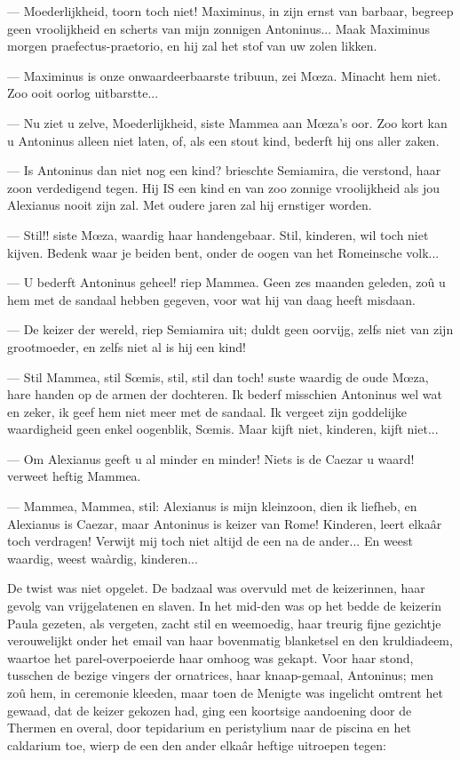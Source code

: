 \documentclass[a4paper, 12pt, oneside, dutch]{article}
\begin{document}
--- Moederlijkheid, toorn toch niet! Maximinus, in zijn ernst van barbaar, begreep geen vroolijkheid en scherts van mijn zonnigen Antoninus... Maak Maximinus morgen praefectus-praetorio, en hij zal het stof van uw zolen likken.

--- Maximinus is onze onwaardeerbaarste tribuun, zei Mœza. Minacht hem niet. Zoo ooit oorlog uitbarstte...

--- Nu ziet u zelve, Moederlijkheid, siste Mammea aan Mœza's oor. Zoo kort kan u Antoninus alleen niet laten, of, als een stout kind, bederft hij ons aller zaken.

--- Is Antoninus dan niet nog een kind? brieschte Semiamira, die verstond, haar zoon verdedigend tegen. Hij IS een kind en van zoo zonnige vroolijkheid als jou Alexianus nooit zijn zal. Met oudere jaren zal hij ernstiger worden.

--- Stil!! siste Mœza, waardig haar handengebaar. Stil, kinderen, wil toch niet kijven. Bedenk waar je beiden bent, onder de oogen van het Romeinsche volk...

--- U bederft Antoninus geheel! riep Mammea. Geen zes maanden geleden, zoû u hem met de sandaal hebben gegeven, voor wat hij van daag heeft misdaan.

--- De keizer der wereld, riep Semiamira uit; duldt geen oorvijg, zelfs niet van zijn grootmoeder, en zelfs niet al is hij een kind!

--- Stil Mammea, stil Sœmis, stil, stil dan toch! suste waardig de oude Mœza, hare handen op de armen der dochteren. Ik bederf misschien Antoninus wel wat en zeker, ik geef hem niet meer met de sandaal. Ik vergeet zijn goddelijke waardigheid geen enkel oogenblik, Sœmis. Maar kijft niet, kinderen, kijft niet...

--- Om Alexianus geeft u al minder en minder! Niets is de Caezar u waard! verweet heftig Mammea.

--- Mammea, Mammea, stil: Alexianus is mijn kleinzoon, dien ik liefheb, en Alexianus is Caezar, maar Antoninus is keizer van Rome! Kinderen, leert elkaâr toch verdragen! Verwijt mij toch niet altijd de een na de ander... En weest waardig, weest waàrdig, kinderen...

De twist was niet opgelet. De badzaal was overvuld met de keizerinnen, haar gevolg van vrijgelatenen en slaven. In het mid-den was op het bedde de keizerin Paula gezeten, als vergeten, zacht stil en weemoedig, haar treurig fijne gezichtje verouwelijkt onder het email van haar bovenmatig blanketsel en den kruldiadeem, waartoe het parel-overpoeierde haar omhoog was gekapt. Voor haar stond, tusschen de bezige vingers der ornatrices, haar knaap-gemaal, Antoninus; men zoû hem, in ceremonie kleeden, maar toen de Menigte was ingelicht omtrent het gewaad, dat de keizer gekozen had, ging een koortsige aandoening door de Thermen en overal, door tepidarium en peristylium naar de piscina en het caldarium toe, wierp de een den ander elkaâr heftige uitroepen tegen:
\end{document}

